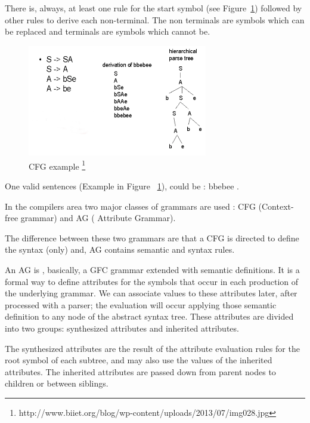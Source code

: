 \documentclass[
  oneside,
  11pt, a4paper,
  footinclude=true,
  headinclude=true,
  cleardoublepage=empty
]{scrbook}
\begin{document}
There is, always, at least one rule for the start symbol (see Figure~\ref{fig:CFG}) followed by other rules to derive each non-terminal.
The non terminals are symbols which can be replaced and terminals are symbols which cannot be.

\begin{figure}[h!]
  \centering
    \includegraphics[width=0.7\textwidth]{img/GIC2.png}
    \caption{CFG example \protect\footnote{http://www.biiet.org/blog/wp-content/uploads/2013/07/img028.jpg}}
    \label{fig:CFG}
\end{figure}


One valid sentences (Example in Figure ~\ref{fig:CFG}), could be : bbebee .

In the compilers area two major classes of grammars are used : CFG (Context-free grammar) and AG ( Attribute Grammar).

The difference between these two grammars are that a CFG is directed to define the syntax (only) and, AG contains semantic and syntax rules.

An AG is , basically, a GFC grammar extended with semantic definitions. It is a formal way to define attributes for the symbols that occur in each production of the underlying grammar. We can associate values to these attributes later, after processed with a parser; the evaluation will occur applying those semantic definition to any node of the abstract syntax tree.
These attributes are divided into two groups: synthesized attributes and inherited attributes.

The synthesized attributes are the result of the attribute evaluation rules for the root symbol of each subtree, and may also use the values of the inherited attributes. The inherited attributes are passed down from parent nodes to children or between siblings.
\end{document}
